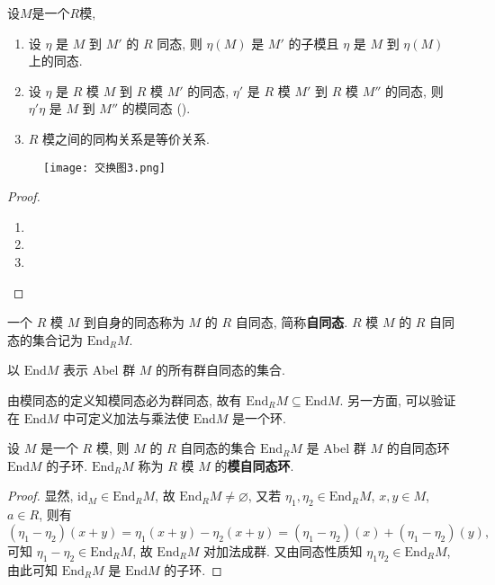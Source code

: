\documentclass[../../main.tex]{subfiles}
\begin{document}
\begin{theorem}
设$M$是一个$R$模,
\begin{enumerate}
\item 设 \( \eta \) 是 \( M \) 到 \( M' \) 的 \( R \) 同态, 则 \( \eta(M) \) 是 \( M' \) 的子模且 \( \eta \) 是 \( M \) 到 \( \eta(M) \) 上的同态.

\item 设 \( \eta \) 是 \( R \) 模 \( M \) 到 \( R \) 模 \( M' \) 的同态, \( \eta' \) 是 \( R \) 模 \( M' \) 到 \( R \) 模 \( M'' \) 的同态, 则 \( \eta'\eta \) 是 \( M \) 到 \( M'' \) 的模同态 ().

\item \( R \) 模之间的同构关系是等价关系.
\end{enumerate}
\end{theorem}
\begin{figure}[H]
\centering
\texttt{[image: 交换图3.png]}
\caption{}
\label{figure:交换图3}
\end{figure}
\begin{proof}
\begin{enumerate}
\item 

\item 

\item 
\end{enumerate}

\end{proof}

\begin{definition}
一个 \( R \) 模 \( M \) 到自身的同态称为 \( M \) 的 \( R \) 自同态, 简称\textbf{自同态}. \( R \) 模 \( M \) 的 \( R \) 自同态的集合记为 \( \text{End}_R M \). 

以 \( \text{End}M \) 表示 Abel 群 \( M \) 的所有群自同态的集合.
\end{definition}
\begin{remark}
由模同态的定义知模同态必为群同态, 故有 \( \text{End}_R M \subseteq \text{End}M \). 另一方面, 可以验证在 \( \text{End}M \) 中可定义加法与乘法使 \( \text{End}M \) 是一个环. 
\end{remark}

\begin{theorem}\label{theorem:抽象代数-定理 1.6.2}
设 \( M \) 是一个 \( R \) 模, 则 \( M \) 的 \( R \) 自同态的集合 \( \text{End}_R M \) 是 Abel 群 \( M \) 的自同态环 \( \text{End}M \) 的子环. \( \text{End}_R M \) 称为 \( R \) 模 \( M \) 的\textbf{模自同态环}.
\end{theorem}
\begin{proof}
显然, \( \text{id}_M \in \text{End}_R M \), 故 \( \text{End}_R M \neq \varnothing \), 又若 \( \eta_1, \eta_2 \in \text{End}_R M \), \( x, y \in M \), \( a \in R \), 则有
\[
(\eta_1 - \eta_2)(x + y) = \eta_1(x + y) - \eta_2(x + y) = (\eta_1 - \eta_2)(x) + (\eta_1 - \eta_2)(y),
\]
可知 \( \eta_1 - \eta_2 \in \text{End}_R M \), 故 \( \text{End}_R M \) 对加法成群. 又由同态性质知 \( \eta_1\eta_2 \in \text{End}_R M \), 由此可知 \( \text{End}_R M \) 是 \( \text{End}M \) 的子环.

\end{proof}
\end{document}
